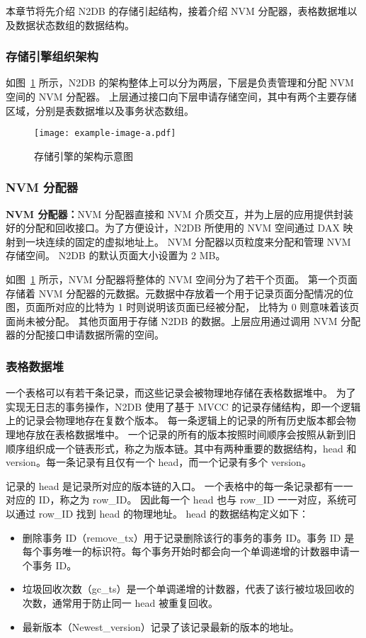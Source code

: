本章节将先介绍 N2DB 的存储引起结构，接着介绍 NVM 分配器，表格数据堆以及数据状态数组的数据结构。



\subsubsection{存储引擎组织架构}

如图~\ref{fig:n2db} 所示，N2DB 的架构整体上可以分为两层，下层是负责管理和分配 NVM 空间的 NVM 分配器。
上层通过接口向下层申请存储空间，其中有两个主要存储区域，分别是表数据堆以及事务状态数组。

\begin{figure}
    \centering
    \texttt{[image: example-image-a.pdf]}
    \caption{存储引擎的架构示意图}
    \label{fig:n2db}
\end{figure}

\subsubsection{NVM 分配器}

\textbf{NVM 分配器：}NVM 分配器直接和 NVM 介质交互，并为上层的应用提供封装好的分配和回收接口。为了方便设计，N2DB 所使用的 NVM 空间通过 DAX 映射到一块连续的固定的虚拟地址上。
NVM 分配器以页粒度来分配和管理 NVM 存储空间。
N2DB 的默认页面大小设置为 2 MB。

如图~\ref{fig:n2db} 所示，NVM 分配器将整体的 NVM 空间分为了若干个页面。
第一个页面存储着 NVM 分配器的元数据。元数据中存放着一个用于记录页面分配情况的位图，页面所对应的比特为 1 时则说明该页面已经被分配，
比特为 0 则意味着该页面尚未被分配。
其他页面用于存储 N2DB 的数据。上层应用通过调用 NVM 分配器的分配接口申请数据所需的空间。

\subsubsection{表格数据堆}

一个表格可以有若干条记录，而这些记录会被物理地存储在表格数据堆中。
为了实现无日志的事务操作，N2DB 使用了基于 MVCC 的记录存储结构，即一个逻辑上的记录会物理地存在复数个版本。
每一条逻辑上的记录的所有历史版本都会物理地存放在表格数据堆中。
一个记录的所有的版本按照时间顺序会按照从新到旧顺序组织成一个链表形式，称之为版本链。其中有两种重要的数据结构，head 和 version。每一条记录有且仅有一个 head，而一个记录有多个 version。

记录的 head 是记录所对应的版本链的入口。
一个表格中的每一条记录都有一一对应的 ID，称之为 row\_ID。
因此每一个 head 也与 row\_ID 一一对应，系统可以通过 row\_ID 找到 head 的物理地址。
head 的数据结构定义如下：
\begin{itemize}
    \item 删除事务 ID（remove\_tx）用于记录删除该行的事务的事务 ID。事务 ID 是每个事务唯一的标识符。每个事务开始时都会向一个单调递增的计数器申请一个事务 ID。
    \item 垃圾回收次数（gc\_ts）是一个单调递增的计数器，代表了该行被垃圾回收的次数，通常用于防止同一 head 被重复回收。
    \item 最新版本（Newest\_version）记录了该记录最新的版本的地址。
\end{itemize}

